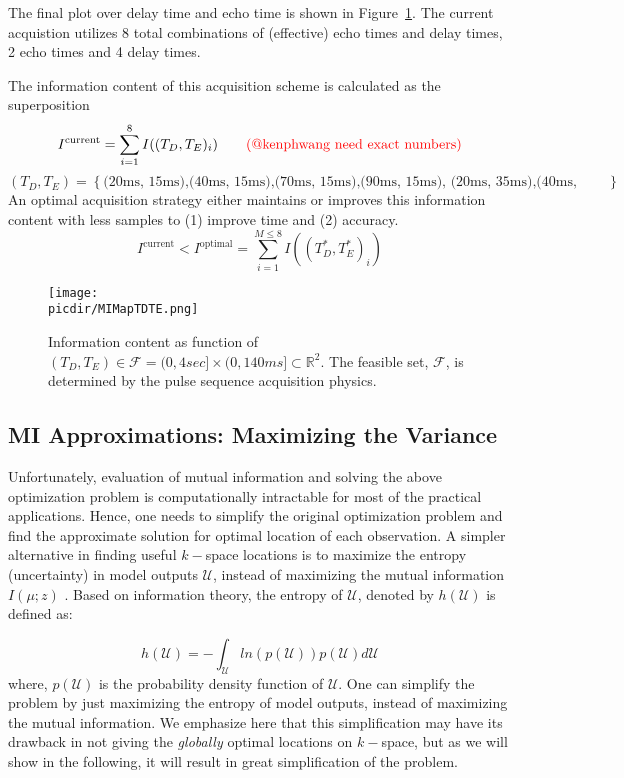 \documentclass{article}         %
\theoremstyle{definition}
\theoremstyle{remark}
\newcommand{\picdir}{pdffig/}
\begin{document}
The final plot over delay time and echo time is shown in Figure~\ref{fig:MIMapTDTE}.
The current acquistion utilizes 8 total combinations of (effective) echo times 
and delay times, 2 echo times and 4 delay times.

The information content of this acquisition scheme is calculated as the superposition
\[
 I^\text{current} = \sum_{i=1}^8 I((T_D, T_E)_i)
\qquad \text{\color{red}(@kenphwang need exact numbers)}
\]
\[
   \left(T_D, T_E\right) = 
   \left\{
   \text{(20ms, 15ms),(40ms, 15ms),(70ms, 15ms),(90ms, 15ms),
         (20ms, 35ms),(40ms, 35ms),(70ms, 35ms),(90ms, 35ms)}
   \right\}
\]
An optimal acquisition strategy either maintains or improves this information content with
less samples to (1) improve time and (2) accuracy.
\[
  I^\text{current} < I^\text{optimal} = \sum_{i=1}^{M \leq 8} I((T^*_D, T^*_E)_i)
\]

\begin{figure}[h] 
\centering
\texttt{[image: \\picdir/MIMapTDTE.png]} 
\caption{ 
Information content as function of $(T_D, T_E) \in \mathcal{F} = (0,4sec] \times (0,140ms] \subset \mathbb{R}^2 $.
The feasible set, $\mathcal{F} $, 
is determined by the pulse sequence acquisition physics.
}\label{fig:MIMapTDTE}
\end{figure}

\subsection{MI Approximations: Maximizing the Variance}


Unfortunately, evaluation of mutual information and solving the above
optimization problem is computationally intractable for most of the practical
applications. Hence, one needs to simplify the original optimization problem
and find the approximate solution for optimal location of each observation. A
simpler alternative in finding useful $k-$space locations is to maximize the
entropy (uncertainty) in model outputs $\mathcal{U}$, instead of maximizing the
mutual information $I(\mu;z)$ \cite{krause2008}. Based on information theory,
the entropy of $\mathcal{U}$, denoted by $h(\mathcal{U})$ is defined as:
%

\begin{equation}\label{entropy}
h(\mathcal{U})=-\int_{\mathcal{U}} ln\left(p(\mathcal{U})\right)p(\mathcal{U})d\mathcal{U}
\end{equation}
where, $p(\mathcal{U})$ is the probability density function of $\mathcal{U}$. %
One can simplify the problem by just maximizing the entropy of model outputs,
instead of maximizing the mutual information. We emphasize here that this
simplification may have its drawback in not giving the \textit{globally}
optimal locations on $k-$space, but as we will show in the following, it will
result in great simplification of the problem. 
\end{document}
